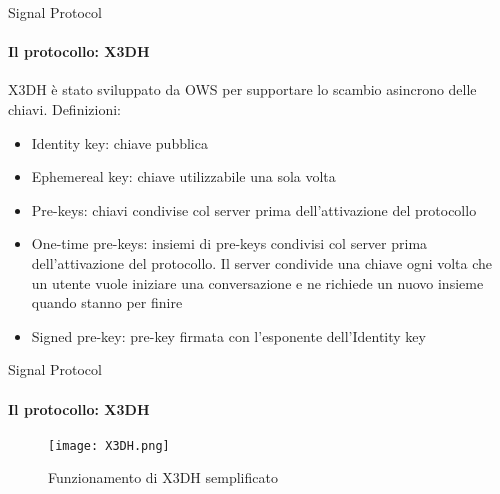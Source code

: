 \begin{frame}{Signal Protocol}
    \framesubtitle{Il protocollo: X3DH}
    X3DH è stato sviluppato da OWS per supportare lo scambio asincrono delle chiavi. \cite{X3DH}\pause\newline
    Definizioni:
    \begin{itemize}
        \item Identity key: chiave pubblica\pause
        \item Ephemereal key: chiave utilizzabile una sola volta \pause
        \item Pre-keys: chiavi condivise col server prima dell'attivazione del protocollo\pause
        \item One-time pre-keys: insiemi di pre-keys condivisi col server prima dell'attivazione del protocollo. Il server condivide una chiave ogni volta che un utente vuole iniziare una conversazione e ne richiede un nuovo insieme quando stanno per finire\pause
        \item Signed pre-key: pre-key firmata con l'esponente dell'Identity key
    \end{itemize}

\end{frame}

\begin{frame}{Signal Protocol}
    \framesubtitle{Il protocollo: X3DH}

    \begin{figure}
        \centering
        \texttt{[image: X3DH.png]}
        \caption{Funzionamento di X3DH semplificato}
    \end{figure}

    \cite{VanDam}
\end{frame}
